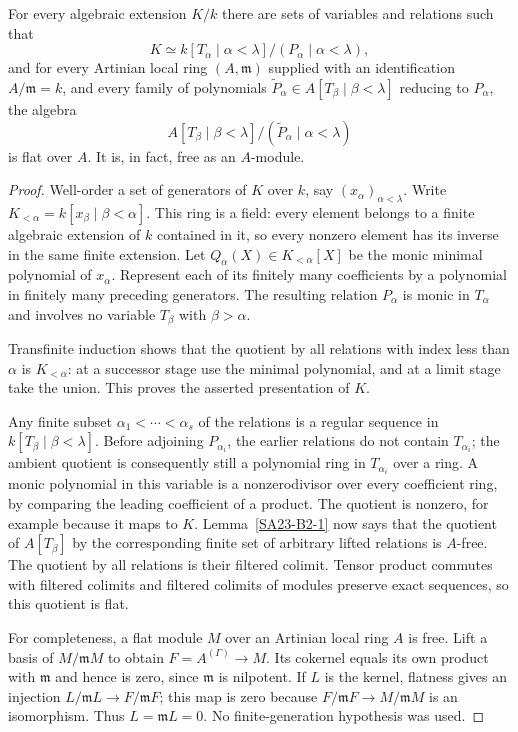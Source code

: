 \begin{theorem}\label{SA23-B2-2}
For every algebraic extension $K/k$ there are sets of variables and
relations such that
\[
 K\simeq k[T_\alpha\mid\alpha<\lambda]/(P_\alpha\mid\alpha<\lambda),
\]
and for every Artinian local ring $(A,\mathfrak m)$ supplied with an
identification $A/\mathfrak m=k$, and every family of polynomials
$\widetilde P_\alpha\in A[T_\beta\mid\beta<\lambda]$ reducing to
$P_\alpha$, the algebra
\[
 A[T_\beta\mid\beta<\lambda]/(\widetilde P_\alpha\mid\alpha<\lambda)
\]
is flat over $A$.  It is, in fact, free as an $A$-module.
\end{theorem}
\begin{proof}
Well-order a set of generators of $K$ over $k$, say
$(x_\alpha)_{\alpha<\lambda}$.  Write
$K_{<\alpha}=k[x_\beta\mid\beta<\alpha]$.  This ring is a field:
every element belongs to a finite algebraic extension of $k$ contained in
it, so every nonzero element has its inverse in the same finite extension.
Let $Q_\alpha(X)\in K_{<\alpha}[X]$ be the monic minimal polynomial of
$x_\alpha$.  Represent each of its finitely many coefficients by a
polynomial in finitely many preceding generators.  The resulting relation
$P_\alpha$ is monic in $T_\alpha$ and involves no variable $T_\beta$
with $\beta>\alpha$.

Transfinite induction shows that the quotient by all relations with index
less than $\alpha$ is $K_{<\alpha}$: at a successor stage use the minimal
polynomial, and at a limit stage take the union.  This proves the asserted
presentation of $K$.

Any finite subset $\alpha_1<\cdots<\alpha_s$ of the relations is a
regular sequence in $k[T_\beta\mid\beta<\lambda]$.  Before adjoining
$P_{\alpha_i}$, the earlier relations do not contain $T_{\alpha_i}$;
the ambient quotient is consequently still a polynomial ring in
$T_{\alpha_i}$ over a ring.  A monic polynomial in this variable is a
nonzerodivisor over every coefficient ring, by comparing the leading
coefficient of a product.  The quotient is nonzero, for example because
it maps to $K$.  Lemma~\ref{SA23-B2-1} now says that the quotient of
$A[T_\beta]$ by the corresponding finite set of arbitrary lifted
relations is $A$-free.  The quotient by all relations is their filtered
colimit.  Tensor product commutes with filtered colimits and filtered
colimits of modules preserve exact sequences, so this quotient is flat.

For completeness, a flat module $M$ over an Artinian local ring $A$ is
free.  Lift a basis of $M/\mathfrak mM$ to obtain
$F=A^{(\Gamma)}\to M$.  Its cokernel equals its own product with
$\mathfrak m$ and hence is zero, since $\mathfrak m$ is nilpotent.
If $L$ is the kernel, flatness gives an injection
$L/\mathfrak mL\to F/\mathfrak mF$; this map is zero because
$F/\mathfrak mF\to M/\mathfrak mM$ is an isomorphism.  Thus
$L=\mathfrak mL=0$.  No finite-generation hypothesis was used.
\end{proof}

